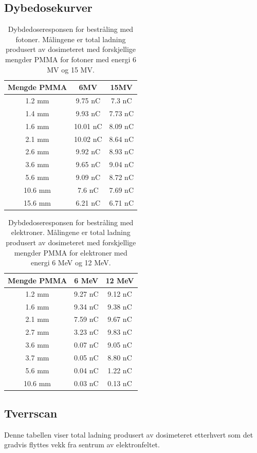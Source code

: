 \documentclass[a4paper, 11pt, notitlepage]{article}
\begin{document}
\subsection{Dybedosekurver}
\begin{table}
 \centering
\begin{tabular}{|c|c|c|}
\hline
Mengde PMMA & 6MV & 15MV \\ \hline
1.2 mm& 9.75 nC & 7.3 nC \\ \hline
1.4 mm& 9.93 nC & 7.73 nC \\ \hline
1.6 mm& 10.01 nC & 8.09 nC \\ \hline
2.1 mm& 10.02 nC & 8.64 nC \\ \hline
2.6 mm& 9.92 nC & 8.93 nC \\ \hline
3.6 mm& 9.65 nC & 9.04 nC \\ \hline
5.6 mm& 9.09 nC & 8.72 nC \\ \hline
10.6 mm & 7.6 nC & 7.69 nC \\ \hline
15.6 mm & 6.21 nC & 6.71 nC \\ \hline
\end{tabular}
\caption{Dybdedoseresponsen for bestråling med fotoner. Målingene er total ladning produsert av dosimeteret med forskjellige mengder PMMA for fotoner med energi 6 MV og 15 MV.}
\end{table}
\begin{table}
\centering
\begin{tabular}{|c|c|c|}
\hline
Mengde PMMA & 6 MeV & 12 MeV \\ \hline
1.2 mm & 9.27 nC & 9.12 nC \\ \hline
1.6 mm & 9.34 nC & 9.38 nC \\ \hline
2.1 mm & 7.59 nC & 9.67 nC \\ \hline
2.7 mm & 3.23 nC & 9.83 nC \\ \hline
3.6 mm & 0.07 nC & 9.05 nC \\ \hline
3.7 mm& 0.05 nC & 8.80 nC \\ \hline
5.6 mm & 0.04 nC & 1.22 nC \\ \hline
10.6 mm & 0.03 nC & 0.13 nC \\ \hline
\end{tabular}
\caption{Dybdedoseresponsen for bestråling med elektroner. Målingene er total ladning produsert av dosimeteret med forskjellige mengder PMMA for elektroner med energi 6 MeV og 12 MeV.}
\end{table}

\subsection{Tverrscan}
Denne tabellen viser total ladning produsert av dosimeteret etterhvert som det gradvis flyttes vekk fra sentrum av elektronfeltet.
\end{document}
